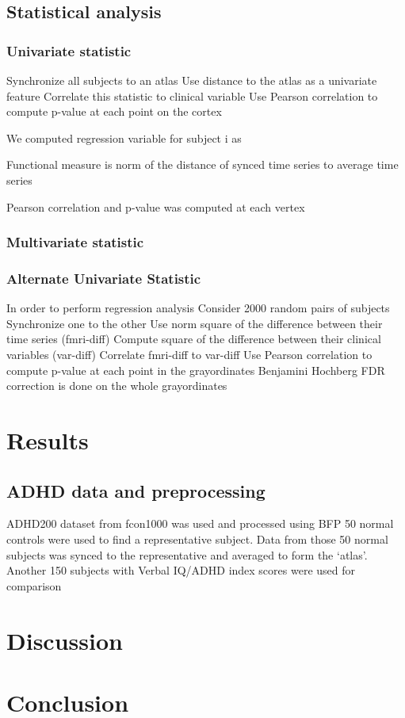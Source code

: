 \documentclass[preprint,12pt]{elsarticle}
\begin{document}
\subsection{Statistical analysis}
\subsubsection{Univariate statistic}
Synchronize all subjects to an atlas
Use distance to the atlas as a univariate feature
Correlate this statistic to clinical variable
Use Pearson correlation to compute p-value at each point on the cortex

We computed regression variable for subject i as 

Functional measure is norm of the distance of synced time series to average time series

Pearson correlation and p-value was computed at each vertex

\subsubsection{Multivariate statistic}

\subsubsection{Alternate Univariate Statistic}

In order to perform regression analysis
Consider 2000 random pairs of subjects
Synchronize one to the other 
Use norm square of the difference between their time series (fmri-diff)
Compute square of the difference between their clinical variables (var-diff)
Correlate fmri-diff to var-diff
Use Pearson correlation to compute p-value at each point in the grayordinates
Benjamini Hochberg FDR correction is done on the whole grayordinates


\section{Results}
\subsection{ADHD data and preprocessing}
ADHD200 dataset from fcon1000 was used and processed using BFP
50 normal controls were used to find a representative subject. Data from those  50 normal subjects was synced to the representative and averaged to form the ‘atlas’.
Another 150 subjects with Verbal IQ/ADHD index scores were used for comparison

\section{Discussion}

\section{Conclusion}
\label{S:2}




\end{document}
